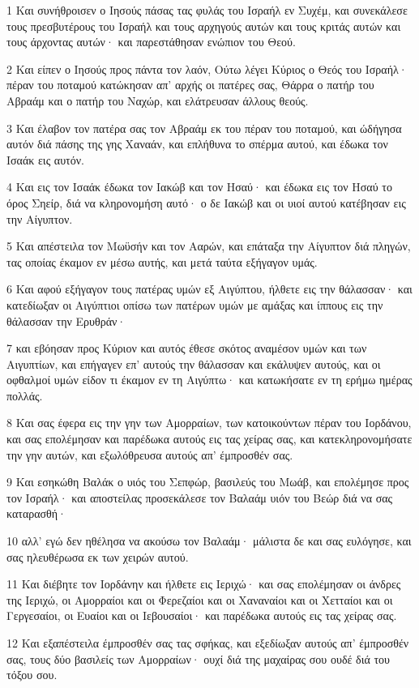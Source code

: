 \par 1 Και συνήθροισεν ο Ιησούς πάσας τας φυλάς του Ισραήλ εν Συχέμ, και συνεκάλεσε τους πρεσβυτέρους του Ισραήλ και τους αρχηγούς αυτών και τους κριτάς αυτών και τους άρχοντας αυτών· και παρεστάθησαν ενώπιον του Θεού.
\par 2 Και είπεν ο Ιησούς προς πάντα τον λαόν, Ούτω λέγει Κύριος ο Θεός του Ισραήλ· πέραν του ποταμού κατώκησαν απ' αρχής οι πατέρες σας, Θάρρα ο πατήρ του Αβραάμ και ο πατήρ του Ναχώρ, και ελάτρευσαν άλλους θεούς.
\par 3 Και έλαβον τον πατέρα σας τον Αβραάμ εκ του πέραν του ποταμού, και ώδήγησα αυτόν διά πάσης της γης Χαναάν, και επλήθυνα το σπέρμα αυτού, και έδωκα τον Ισαάκ εις αυτόν.
\par 4 Και εις τον Ισαάκ έδωκα τον Ιακώβ και τον Ησαύ· και έδωκα εις τον Ησαύ το όρος Σηείρ, διά να κληρονομήση αυτό· ο δε Ιακώβ και οι υιοί αυτού κατέβησαν εις την Αίγυπτον.
\par 5 Και απέστειλα τον Μωϋσήν και τον Ααρών, και επάταξα την Αίγυπτον διά πληγών, τας οποίας έκαμον εν μέσω αυτής, και μετά ταύτα εξήγαγον υμάς.
\par 6 Και αφού εξήγαγον τους πατέρας υμών εξ Αιγύπτου, ήλθετε εις την θάλασσαν· και κατεδίωξαν οι Αιγύπτιοι οπίσω των πατέρων υμών με αμάξας και ίππους εις την θάλασσαν την Ερυθράν·
\par 7 και εβόησαν προς Κύριον και αυτός έθεσε σκότος αναμέσον υμών και των Αιγυπτίων, και επήγαγεν επ' αυτούς την θάλασσαν και εκάλυψεν αυτούς, και οι οφθαλμοί υμών είδον τι έκαμον εν τη Αιγύπτω· και κατωκήσατε εν τη ερήμω ημέρας πολλάς.
\par 8 Και σας έφερα εις την γην των Αμορραίων, των κατοικούντων πέραν του Ιορδάνου, και σας επολέμησαν και παρέδωκα αυτούς εις τας χείρας σας, και κατεκληρονομήσατε την γην αυτών, και εξωλόθρευσα αυτούς απ' έμπροσθέν σας.
\par 9 Και εσηκώθη Βαλάκ ο υιός του Σεπφώρ, βασιλεύς του Μωάβ, και επολέμησε προς τον Ισραήλ· και αποστείλας προσεκάλεσε τον Βαλαάμ υιόν του Βεώρ διά να σας καταρασθή·
\par 10 αλλ' εγώ δεν ηθέλησα να ακούσω τον Βαλαάμ· μάλιστα δε και σας ευλόγησε, και σας ηλευθέρωσα εκ των χειρών αυτού.
\par 11 Και διέβητε τον Ιορδάνην και ήλθετε εις Ιεριχώ· και σας επολέμησαν οι άνδρες της Ιεριχώ, οι Αμορραίοι και οι Φερεζαίοι και οι Χαναναίοι και οι Χετταίοι και οι Γεργεσαίοι, οι Ευαίοι και οι Ιεβουσαίοι· και παρέδωκα αυτούς εις τας χείρας σας.
\par 12 Και εξαπέστειλα έμπροσθέν σας τας σφήκας, και εξεδίωξαν αυτούς απ' έμπροσθέν σας, τους δύο βασιλείς των Αμορραίων· ουχί διά της μαχαίρας σου ουδέ διά του τόξου σου.
